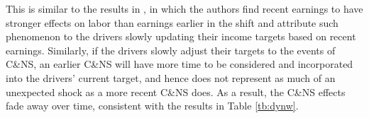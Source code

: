 \documentclass[reviewmode,AEJ]{AEA}
\begin{document}




This is similar to the results in \citet{thakral2018daily}, in which the authors find recent
earnings to have stronger effects on labor than earnings earlier in the shift%
 and attribute such phenomenon to the drivers slowly updating their income targets based on recent earnings.
Similarly, if the drivers slowly adjust their targets to the events of C\&NS, an earlier C\&NS will have
more time to be considered and incorporated into the drivers' current target, and hence does not represent
as much of an unexpected shock as a more recent C\&NS does. As a result, the C\&NS effects fade away over
time, consistent with the results in Table \ref{tb:dynw}.
\end{document}
